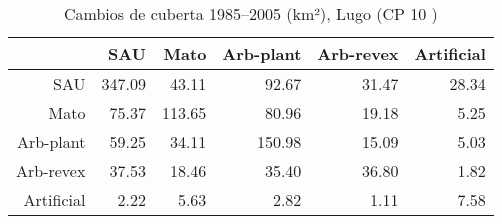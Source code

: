 \begin{table}[p]
\centering
\caption{Cambios de cuberta 1985--2005 (km²), Lugo (CP 10 )} 
\label{TaboaContinxCP10}
\begin{tabular}{rrrrrr}
  \hline
 & SAU & Mato & Arb-plant & Arb-revex & Artificial \\ 
  \hline
SAU & 347.09 & 43.11 & 92.67 & 31.47 & 28.34 \\ 
  Mato & 75.37 & 113.65 & 80.96 & 19.18 & 5.25 \\ 
  Arb-plant & 59.25 & 34.11 & 150.98 & 15.09 & 5.03 \\ 
  Arb-revex & 37.53 & 18.46 & 35.40 & 36.80 & 1.82 \\ 
  Artificial & 2.22 & 5.63 & 2.82 & 1.11 & 7.58 \\ 
   \hline
\end{tabular}
\end{table}

